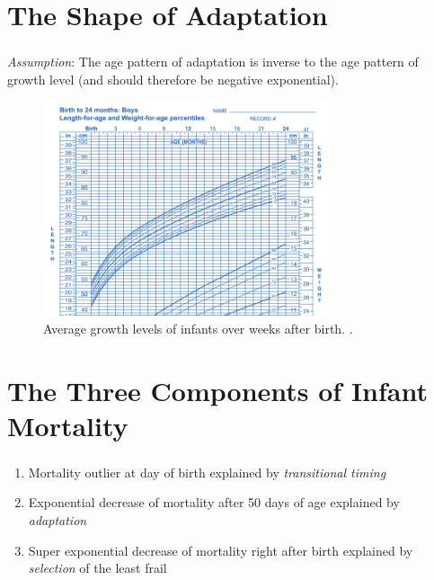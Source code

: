 \documentclass{beamer}
\begin{document}
\section{The Shape of Adaptation} %

\begin{frame}
\frametitle{\insertsection}

\small{\emph{Assumption}: The age pattern of adaptation is inverse to the age pattern of growth level (and should therefore be negative exponential).}

\begin{figure}[htb!]
\includegraphics[width = 0.75\textwidth]{./fig/igrowth.png} \\
Average growth levels of infants over weeks after birth. \cite{WHO2009}.
\end{figure}

\end{frame}

\section{The Three Components of Infant Mortality} %

\begin{frame}
\frametitle{\insertsection}

\begin{enumerate}
\item Mortality outlier at day of birth explained by \emph{transitional timing}
\item Exponential decrease of mortality after 50 days of age explained by \emph{adaptation}
\item Super exponential decrease of mortality right after birth explained by \emph{selection} of the least frail
\end{enumerate}

\end{frame}
\end{document}
